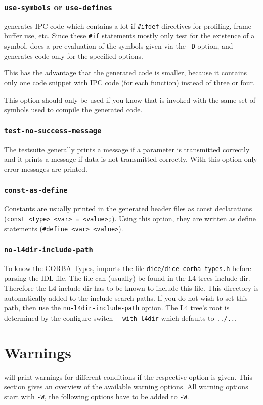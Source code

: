 \subsubsection{{\tt use-symbols} or {\tt use-defines}}
\dice{} generates IPC code which contains a lot if \verb|#ifdef|
directives for profiling, frame-buffer use, etc. Since these \verb|#if|
statements mostly only test for the existence of a symbol, \dice{}
does a pre-evaluation of the symbols given via the {\tt -D} option,
and generates code only for the specified options.

This has the advantage that the generated code is smaller, because it
contains only one code snippet with IPC code (for each function) instead
of three or four.

This option should only be used if you know that \dice{} is invoked with
the same set of symbols used to compile the generated code.

\subsubsection{{\tt test-no-success-message}}
The testsuite generally prints a message if a parameter is transmitted 
correctly and it prints a message if data is not transmitted correctly.
With this option only error messages are printed.

\subsubsection{\tt const-as-define}
Constants are usually printed in the generated header files as const
declarations (\verb|const <type> <var> = <value>;|). Using this option,
they are written as define statements (\verb|#define <var> <value>|).

\subsubsection{\tt no-l4dir-include-path}
To know the CORBA Types, \dice{} imports the file \verb|dice/dice-corba-types.h|
before parsing the IDL file. The file can (usually) be found in
the L4 trees include dir. Therefore the L4 include dir has to be
known to include this file. This directory is automatically added to
the include search paths. If you do not wish to set this path, then
use the {\tt no-l4dir-include-path} option. The L4 tree's root is
determined by the configure switch \verb|--with-l4dir| which defaults
to \verb|../..|.

\section{Warnings}
\dice{} will print warnings for different conditions if the respective
option is given. This section gives an overview of the available warning
options. All warning options start with \verb|-W|, the following options
have to be added to \verb|-W|.

